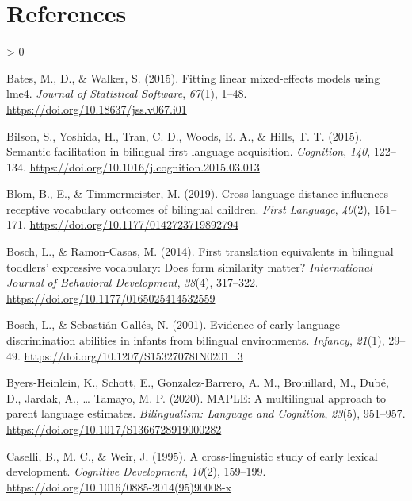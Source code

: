 \documentclass[
  english,
  ,man,floatsintext]{apa6}
\newlength{\cslhangindent}
\newenvironment{CSLReferences}[2] %
 {%
  \setlength{\parindent}{0pt}
  \ifodd #1 \everypar{\setlength{\hangindent}{\cslhangindent}}\ignorespaces\fi
  \ifnum #2 > 0
  \setlength{\parskip}{#2\baselineskip}
  \fi
 }%
 {}
\begin{document}
\newpage

\hypertarget{references}{%
\section{References}\label{references}}

\begingroup
\setlength{\parindent}{-0.5in}

\hypertarget{refs}{}
\begin{CSLReferences}{1}{0}
\leavevmode\hypertarget{ref-Bates_etal_2015}{}%
Bates, M., D., \& Walker, S. (2015). Fitting linear mixed-effects models using lme4. \emph{Journal of Statistical Software}, \emph{67}(1), 1--48. \url{https://doi.org/10.18637/jss.v067.i01}

\leavevmode\hypertarget{ref-Bilson_etal_2015}{}%
Bilson, S., Yoshida, H., Tran, C. D., Woods, E. A., \& Hills, T. T. (2015). Semantic facilitation in bilingual first language acquisition. \emph{Cognition}, \emph{140}, 122--134. \url{https://doi.org/10.1016/j.cognition.2015.03.013}

\leavevmode\hypertarget{ref-Blom_etal_2019}{}%
Blom, B., E., \& Timmermeister, M. (2019). Cross-language distance influences receptive vocabulary outcomes of bilingual children. \emph{First Language}, \emph{40}(2), 151--171. \url{https://doi.org/10.1177/0142723719892794}

\leavevmode\hypertarget{ref-Bosch_Ramon-Casas_2014}{}%
Bosch, L., \& Ramon-Casas, M. (2014). First translation equivalents in bilingual toddlers' expressive vocabulary: Does form similarity matter? \emph{International Journal of Behavioral Development}, \emph{38}(4), 317--322. \url{https://doi.org/10.1177/0165025414532559}

\leavevmode\hypertarget{ref-Bosch_Sebastian-Galles_2001}{}%
Bosch, L., \& Sebastián-Gallés, N. (2001). Evidence of early language discrimination abilities in infants from bilingual environments. \emph{Infancy}, \emph{21}(1), 29--49. \url{https://doi.org/10.1207/S15327078IN0201_3}

\leavevmode\hypertarget{ref-Byers-Heinlein_etal_2020}{}%
Byers-Heinlein, K., Schott, E., Gonzalez-Barrero, A. M., Brouillard, M., Dubé, D., Jardak, A., \ldots{} Tamayo, M. P. (2020). MAPLE: A multilingual approach to parent language estimates. \emph{Bilingualism: Language and Cognition}, \emph{23}(5), 951--957. \url{https://doi.org/10.1017/S1366728919000282}

\leavevmode\hypertarget{ref-Caselli_etal_1995}{}%
Caselli, B., M. C., \& Weir, J. (1995). A cross-linguistic study of early lexical development. \emph{Cognitive Development}, \emph{10}(2), 159--199. \url{https://doi.org/10.1016/0885-2014(95)90008-x}


\end{CSLReferences}
\end{document}

